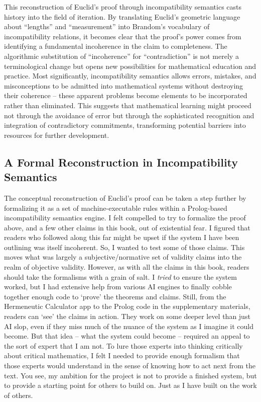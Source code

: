 \documentclass[12pt]{book}
\begin{document}
This reconstruction of Euclid's proof through incompatibility semantics casts history into the field of iteration. By translating Euclid's geometric language about ``lengths'' and ``measurement'' into Brandom's vocabulary of incompatibility relations, it becomes clear that the proof's power comes from identifying a fundamental incoherence in the claim to completeness. The algorithmic substitution of ``incoherence'' for ``contradiction'' is not merely a terminological change but opens new possibilities for mathematical education and practice. Most significantly, incompatibility semantics allows errors, mistakes, and misconceptions to be admitted into mathematical systems without destroying their coherence -- these apparent problems become elements to be incorporated rather than eliminated. This suggests that mathematical learning might proceed not through the avoidance of error but through the sophisticated recognition and integration of contradictory commitments, transforming potential barriers into resources for further development.

\subsection{A Formal Reconstruction in Incompatibility Semantics}

The conceptual reconstruction of Euclid's proof can be taken a step further by formalizing it as a set of machine-executable rules within a Prolog-based incompatibility semantics engine. I felt compelled to try to formalize the proof above, and a few other claims in this book, out of existential fear. I figured that readers who followed along this far might be upset if the system I have been outlining was itself incoherent. So, I wanted to test some of those claims. This moves what was largely a subjective/normative set of validity claims into the realm of objective validity. However, as with all the claims in this book, readers should take the formalisms with a grain of salt. I \textit{tried} to ensure the system worked, but I had extensive help from various AI engines to finally cobble together enough code to `prove' the theorems and claims. Still, from the Hermeneutic Calculator app to the Prolog code in the supplementary materials, readers can `see' the claims in action. They work on some deeper level than just AI slop, even if they miss much of the nuance of the system as I imagine it could become. But that idea -- what the system could become -- required an appeal to the sort of expert that I am not. To lure those experts into thinking critically about critical mathematics, I felt I needed to provide enough formalism that those experts would understand in the sense of knowing how to act next from the text. You see, my ambition for the project is not to provide a finished system, but to provide a starting point for others to build on. Just as I have built on the work of others. 
\end{document}
